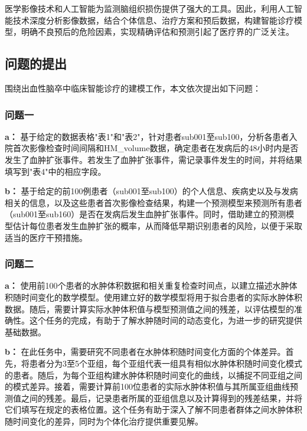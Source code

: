 \documentclass[bwprint]{gmcmthesis}
\begin{document}
医学影像技术和人工智能为监测脑组织损伤提供了强大的工具\cite{徐凤霞1996医学影像新技术在脑血管病诊断中的应用,李如画2018医学影像在诊断过程中的作用}。因此，利用人工智能技术深度分析影像数据，结合个体信息、治疗方案和预后数据，构建智能诊疗模型，明确不良预后的危险因素，实现精确评估和预测引起了医疗界的广泛关注。



\subsection{问题的提出}


\noindent 围绕出血性脑卒中临床智能诊疗的建模工作，本文依次提出如下问题：
\subsubsection{问题一}
\textbf{a：} 基于给定的数据表格"表1"和"表2"，针对患者sub001至sub100，分析各患者入院首次影像检查时间间隔和HM\_volume数据，确定患者在发病后的48小时内是否发生了血肿扩张事件。若发生了血肿扩张事件，需记录事件发生的时间，并将结果填写到"表4"中的相应字段。


\textbf{b：} 基于给定的前100例患者（sub001至sub100）的个人信息、疾病史以及与发病相关的信息，以及这些患者首次影像检查结果，构建一个预测模型来预测所有患者（sub001至sub160）是否在发病后发生血肿扩张事件。同时，借助建立的预测模型估计每位患者发生血肿扩张的概率，从而降低早期识别患者的风险，以便于采取适当的医疗干预措施。

\subsubsection{问题二}
\textbf{a：} 使用前100个患者的水肿体积数据和相关重复检查时间点，以建立描述水肿体积随时间变化的数学模型。使用建立好的数学模型将用于拟合患者的实际水肿体积数据。随后，需要计算实际水肿体积值与模型预测值之间的残差，以评估模型的准确性。这个任务的完成，有助于了解水肿随时间的动态变化，为进一步的研究提供基础数据。


\textbf{b：} 在此任务中，需要研究不同患者在水肿体积随时间变化方面的个体差异。首先，将患者分为3至5个亚组，每个亚组代表一组具有相似水肿体积随时间变化模式的患者。随后，为每个亚组构建水肿体积随时间变化的曲线，以捕捉不同亚组之间的模式差异。接着，需要计算前100位患者的实际水肿体积值与其所属亚组曲线预测值之间的残差。最后，记录患者所属的亚组信息以及计算得到的残差结果，并将它们填写在规定的表格位置。这个任务有助于深入了解不同患者群体之间水肿体积随时间变化的差异，同时为个体化治疗提供重要见解。
\end{document}
